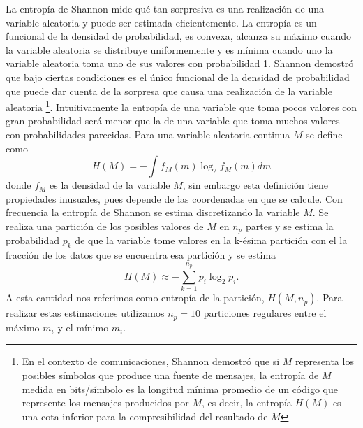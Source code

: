 \documentclass[letterpaper,12pt]{book}
\begin{document}
La entropía de Shannon \cite{shannon_mathematical_1948} mide qué tan sorpresiva es una realización de una variable aleatoria y puede ser estimada eficientemente. La entropía es un funcional de la densidad de probabilidad, es convexa, alcanza su máximo cuando la variable aleatoria se distribuye uniformemente y es mínima cuando uno la variable aleatoria toma uno de sus valores con probabilidad 1. Shannon demostró que bajo ciertas condiciones es el único funcional de la densidad de probabilidad que puede dar cuenta de la sorpresa que causa una realización de la variable aleatoria \cite{shannon_mathematical_1948}\footnote{En el contexto de comunicaciones, Shannon demostró que si $M$ representa los posibles símbolos que produce una fuente de mensajes, la entropía de $M$ medida en bits/símbolo es la longitud mínima promedio de un código que represente los mensajes producidos por $M$, es decir, la entropía $H(M)$ es una cota inferior para la compresibilidad del resultado de $M$}. Intuitivamente la entropía de una variable que toma pocos valores con gran probabilidad será menor que la de una variable que toma muchos valores con probabilidades parecidas. Para una variable aleatoria continua $M$ se define como
\begin{equation}
  H(M)=-\int f_M(m)\log_2f_M(m)dm
\end{equation}
donde $f_M$ es la densidad de la variable $M$, sin embargo esta definición tiene propiedades inusuales, pues depende de las coordenadas en que se calcule. Con frecuencia la entropía de Shannon se estima discretizando la variable $M$. Se realiza una partición de los posibles valores de $M$ en $n_p$ partes y se estima la probabilidad $p_k$ de que la variable tome valores en la k-ésima partición con el la fracción de los datos que se encuentra esa partición y se estima
\begin{equation}
  H(M)\approx-\sum_{k=1}^{n_p}p_i\log_2 p_i.
\end{equation}
A esta cantidad nos referimos como entropía de la partición, $H(M,n_p)$. Para realizar estas estimaciones utilizamos $n_p=10$ particiones regulares entre el máximo $m_i$ y el mínimo $m_i$.
\end{document}
